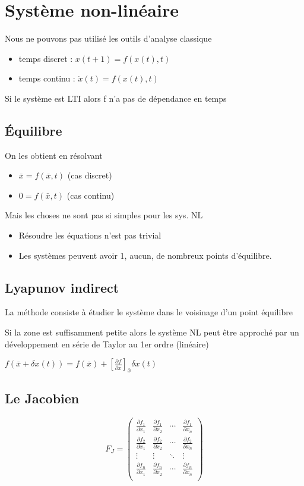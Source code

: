 \documentclass[resume]{subfiles}
\begin{document}
\section{Système non-linéaire}

Nous ne pouvons pas utilisé les outils d'analyse classique 
\begin{itemize}
\item temps discret : $x(t+1)=f(x(t),t)$ 
\item temps continu : $\dot{x}(t)=f(x(t),t)$ 
\end{itemize}

Si le système est LTI alors f n'a pas de dépendance en temps

\subsection{Équilibre}

On les obtient en résolvant
\begin{itemize}
\item $\bar{x}=f(\bar{x},t)$ (cas discret)
\item $0=f(\bar{x},t)$ (cas continu)
\end{itemize}

Mais les choses ne sont pas si simples pour les sys. NL
\begin{itemize}
\item Résoudre les équations n'est pas trivial
\item Les systèmes peuvent avoir 1, aucun, de nombreux points d'équilibre.  
\end{itemize}
\subsection{Lyapunov indirect}

La méthode consiste à étudier le système dans le voisinage d'un point équilibre 

Si la zone est suffisamment petite alors le système NL peut être approché par un développement en série de Taylor au 1er ordre (linéaire)

$f(\bar{x}+\delta x(t))= f(\bar{x})+[\frac{\partial f}{\partial x}]_{\bar{x}} \delta x(t)$ 

\subsection{Le Jacobien}

$$
F_J=\begin{pmatrix}
\frac{\partial f_1}{\partial x_1} & \frac{\partial f_1}{\partial x_2} & \cdots & \frac{\partial f_1}{\partial x_n} \\
\frac{\partial f_2}{\partial x_1} & \frac{\partial f_2}{\partial x_2} & \cdots & \frac{\partial f_2}{\partial x_n} \\
\vdots & \vdots & \ddots & \vdots\\
\frac{\partial f_n}{\partial x_1} & \frac{\partial f_n}{\partial x_2} & \cdots & \frac{\partial f_n}{\partial x_n} \\
\end{pmatrix}
$$
\end{document}
